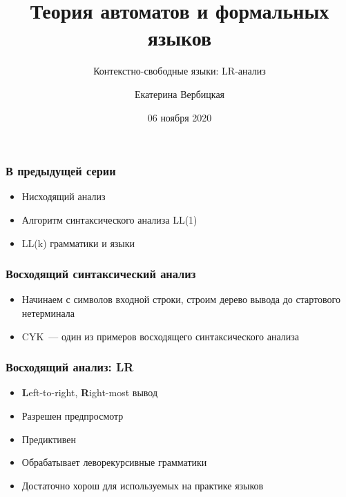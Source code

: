\documentclass{beamer}
\title[]{Теория автоматов и формальных языков}
\subtitle[]{Контекстно-свободные языки: LR-анализ}
\institute[]{
Санкт-Петербургский государственный электротехнический университет <<ЛЭТИ>>\\
}
\author[]{Екатерина Вербицкая}
\date{06 ноября 2020}
\begin{document}
{
  \begin{frame}
    \titlepage
  \end{frame}
}


\begin{frame}[fragile]
  \transwipe[direction=90]
  \frametitle{В предыдущей серии}
  \begin{itemize}
    \item Нисходящий анализ
    \item Алгоритм синтаксического анализа LL(1)
    \item LL(k) грамматики и языки
  \end{itemize}
\end{frame}

\begin{frame}[fragile]
  \transwipe[direction=90]
  \frametitle{Восходящий синтаксический анализ}
  \begin{itemize}
    \item Начинаем с символов входной строки, строим дерево вывода до стартового нетерминала
    \item CYK~--- один из примеров восходящего синтаксического анализа
  \end{itemize}

\end{frame}

\begin{frame}[fragile]
  \transwipe[direction=90]
  \frametitle{Восходящий анализ: LR}
  \begin{itemize}
    \item \textbf{L}eft-to-right, \textbf{R}ight-most вывод
    \item Разрешен предпросмотр
    \item Предиктивен
    \item Обрабатывает леворекурсивные грамматики
    \item Достаточно хорош для используемых на практике языков
  \end{itemize}
\end{frame}
\end{document}

